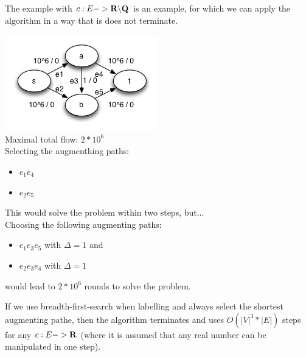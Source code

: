 \begin{proposition}
The example with $c: E -> \textbf{R} \backslash \textbf{Q}$ is an example, for which we can apply the algorithm in a way that is does not terminate. 
\end{proposition}

\begin{example}
\includegraphics{diagrams/Chapter3_Example_4.jpg} \\
Maximal total flow: $2 * 10^6$ \\
Selecting the augmenthing paths: 
\begin{itemize}
\item $e_1 e_4$ 
\item $e_2 e_5$
\end{itemize}
This would solve the problem within two steps, but... \\
Choosing the following augmenting paths: 
\begin{itemize}
\item $e_1 e_3 e_5$ with $\Delta = 1$ and
\item $e_2 e_3 e_4$ with $\Delta = 1$ 
\end{itemize}
would lead to $2*10^6$ rounds to solve the problem. 
\end{example}

\begin{theorem}
If we use breadth-first-search when labelling and always select the shortest augmenting pathe, then the algorithm terminates and uses $O(|V|^3 * |E|)$ steps for any $c:E -> \textbf{R}$ (where it is assumed that any real number can be manipulated in one step).
\end{theorem}

